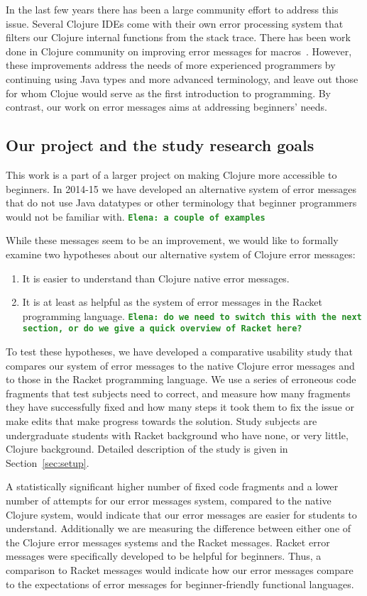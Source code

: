 \documentclass[12pt]{article}
\newcommand{\comment}[1]{{\bf \tt  {#1}}}
\newcommand{\emcomment}[1]{\textcolor{ForestGreen}{\comment{Elena: {#1}}}}
\begin{document}
In the last few years there has been a large community effort to address this issue. Several Clojure IDEs come with their own error processing system that filters our Clojure internal functions from the stack trace. There has been work done in Clojure community on improving error messages for macros~\cite{fleming}. However, these improvements address the needs of more experienced programmers by continuing using Java types and more advanced terminology, and leave out those for whom Clojue would serve as the first introduction to programming. By contrast, our work on error messages aims at addressing beginners' needs.  

	\subsection{Our project and the study research goals}\label{sec:goals}
This work is a part of a larger project on making Clojure more accessible to beginners. In 2014-15 we have developed an alternative system of error messages that do not use Java datatypes or other terminology that beginner programmers would not be familiar with. 
\emcomment{a couple of examples}

While these messages seem to be an improvement, we would like to formally examine two hypotheses about our alternative system of Clojure error messages:
\begin{enumerate}
\item It is easier to understand than Clojure native error messages.
\item It is at least as helpful as the system of error messages in the Racket programming language. \emcomment{do we need to switch this with the next section, or do we give a quick overview of Racket here?}
\end{enumerate}
To test these hypotheses, we have developed a comparative usability study that compares our system of error messages to the native Clojure error messages and to those in the Racket programming language. We use a series of erroneous code fragments that test subjects need to correct, and measure how many fragments they have successfully fixed and how many steps it took them to fix the issue or make edits that make progress towards the solution. 
Study subjects are undergraduate students with Racket background who have none, or very little, Clojure background. 
Detailed description of the study is given in Section~\ref{sec:setup}. 

A statistically significant higher number of fixed code fragments and a lower number of attempts for our error messages system, compared to the native Clojure system, would indicate that our error messages are easier for students to understand. Additionally we are measuring the difference between either one of the Clojure error messages systems and the Racket messages. Racket error messages were specifically developed to be helpful for beginners. Thus, a comparison to Racket messages would indicate how our error messages compare to the expectations of error messages for beginner-friendly functional languages. 
\end{document}
